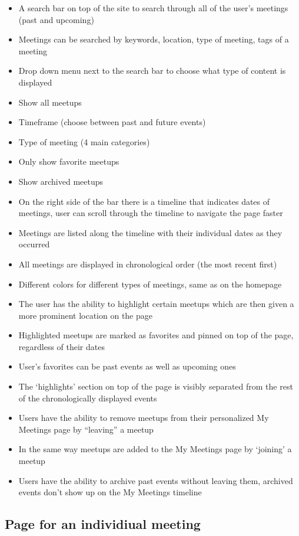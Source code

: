 \documentclass[conference]{IEEEtran}
\begin{document}
\begin{itemize}
\item A search bar on top of the site to search through all of the
user’s meetings (past and upcoming)
\item Meetings can be searched by keywords, location, type of
meeting, tags of a meeting
\item Drop down menu next to the search bar to choose what
type of content is displayed
\item Show all meetups
\item Timeframe (choose between past and future
events)
\item Type of meeting (4 main categories)
\item Only show favorite meetups
\item Show archived meetups
\item On the right side of the bar there is a timeline that indicates dates of meetings, user can scroll through the timeline to navigate the page faster
\item Meetings are listed along the timeline with their individual dates as they occurred
\item All meetings are displayed in chronological order (the most recent first)
\item Different colors for different types of meetings, same as on the homepage
\item The user has the ability to highlight certain meetups which are then given a more prominent location on the page
\item Highlighted meetups are marked as favorites and pinned on top of the page, regardless of their dates
\item User’s favorites can be past events as well as upcoming ones
\item The ‘highlights’ section on top of the page is visibly separated from the rest of the chronologically displayed events
\item Users have the ability to remove meetups from their personalized My Meetings page by “leaving” a meetup
\item In the same way meetups are added to the My Meetings page by ‘joining’ a meetup
\item Users have the ability to archive past events without leaving them, archived events don’t show up on the My Meetings timeline
\end{itemize}

\subsection{Page for an individiual meeting}
\end{document}
